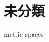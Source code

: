 \documentclass[uplatex, dvipdfmx, a4paper, 12pt, class=jsbook, crop=false]{standalone}
\begin{document}
\chapter{未分類}
\label{chap:uncategorized}

{metric-spaces}
\end{document}
